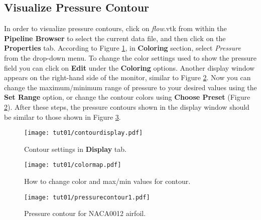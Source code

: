 \subsection{Visualize Pressure Contour}
In order to visualize pressure contours, click on \textit{flow}.vtk from within the \textbf{Pipeline Browser} to select the current data file, and then click on the \textbf{Properties} tab. According to Figure \ref{fig1:colorby}, in \textbf{Coloring} section, select \textit{Pressure} from the drop-down menu. To change the color settings used to show the pressure field you can click on \textbf{Edit} under the \textbf{Coloring} options. Another display window appears on the right-hand side of the monitor, similar to Figure \ref{fig1:change_color_range}. Now you can change the maximum/minimum range of pressure to your desired values using the \textbf{Set Range} option, or change the contour colors using \textbf{Choose Preset} (Figure \ref{fig1:change_color_range}). After these steps, the pressure contours shown in the display window should be similar to those shown in Figure \ref{fig1:pressure_contour}.
\begin{figure}[htbp]
    \centering
    \texttt{[image: tut01/contourdisplay.pdf]}
    \caption{Contour settings in \textbf{Display} tab.}
    \label{fig1:colorby}
\end{figure}
\begin{figure}[htbp]
    \centering
    \texttt{[image: tut01/colormap.pdf]}
    \caption{How to change color and max/min values for contour.}
    \label{fig1:change_color_range}
\end{figure}
\begin{figure}[htbp]
    \centering
    \texttt{[image: tut01/pressurecontour1.pdf]}
    \caption{Pressure contour for NACA0012 airfoil.}
    \label{fig1:pressure_contour}
\end{figure}

